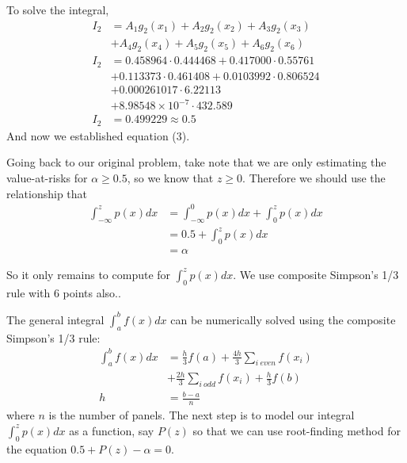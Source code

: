 \documentclass[10pt, twocolumn]{article}
\begin{document}
		To solve the integral,
		$$\begin{aligned}
			I_2 &= A_1g_2(x_1) + A_2g_2(x_2) + A_3g_2(x_3)\\
				&+ A_4g_2(x_4) + A_5g_2(x_5) + A_6g_2(x_6)\\
			I_2 &= 0.458964\cdot0.444468 + 0.417000\cdot0.55761\\
				&+ 0.113373\cdot0.461408 + 0.0103992\cdot0.806524\\
				&+ 0.000261017\cdot6.22113\\
				&+ 8.98548\times10^{-7}\cdot432.589\\
			I_2 &= 0.499229 \approx 0.5
		\end{aligned}$$
		And now we established equation (3).
		
		Going back to our original problem, take note that we are only estimating the value-at-risks for $\alpha\geq0.5$, so we know that $z\geq0$.
		Therefore we should use the relationship that
		$$\begin{aligned}
			\int_{-\infty}^{z}p(x)dx &= \int_{-\infty}^{0}p(x)dx + \int_{0}^{z}p(x)dx\\
				&= 0.5 + \int_{0}^{z}p(x)dx\\
				&= \alpha
		\end{aligned}$$
		
		So it only remains to compute for $\int_{0}^{z}p(x)dx$.
		We use composite Simpson's 1/3 rule with 6 points also..
		
		The general integral $\int_{a}^{b}f(x)dx$ can be numerically solved using the composite Simpson's 1/3 rule:
		\begin{equation}
		\begin{aligned}
			\int_{a}^{b}f(x)dx &= \frac{h}{3}f(a) + \frac{4h}{3}\sum_{i\:even}f(x_i)\\
			&+ \frac{2h}{3}\sum_{i\:odd}f(x_i) + \frac{h}{3}f(b)\\
			h &= \frac{b-a}{n}
		\end{aligned}
		\end{equation}
		where $n$ is the number of panels. The next step is to model our integral $\int_{0}^{z}p(x)dx$ as a function, say $P(z)$ so that we can use root-finding method for the equation $0.5 + P(z)-\alpha=0$.
		
\end{document}
